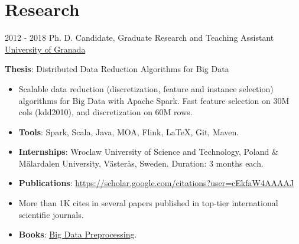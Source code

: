 \documentclass[letterpaper]{twentysecondcv} %
\begin{document}


\section{Research}
\begin{twenty}
	\twentyitem
    	{2012 - 2018}
		{}
        {Ph. D. Candidate, Graduate Research and Teaching Assistant}
        {\href{http://www.ugr.es/}{University of Granada}}
        {}
        {
       	\textbf{Thesis}: Distributed Data Reduction Algorithms for Big Data
        {\begin{itemize}
        \item Scalable data reduction (discretization, feature and instance selection) algorithms for Big Data with Apache Spark. Fast feature selection on 30M cols (kdd2010), and discretization on 60M rows.
        \item \textbf{Tools}: Spark, Scala, Java, MOA, Flink, \LaTeX, Git, Maven.
        \item \textbf{Internships}: Wroclaw University of Science and Technology, Poland \& M\"alardalen University, V\"aster\aa s, Sweden. Duration: 3 months each.        
        \item \textbf{Publications}: \url{https://scholar.google.com/citations?user=cEkfaW4AAAAJ}
        \item More than 1K cites in several papers published in top-tier international scientific journals.
        \item \textbf{Books}: \href{https://link.springer.com/book/10.1007/978-3-030-39105-8}{Big Data Preprocessing}. 
		\end{itemize}}
        }
\end{twenty}
\end{document}
